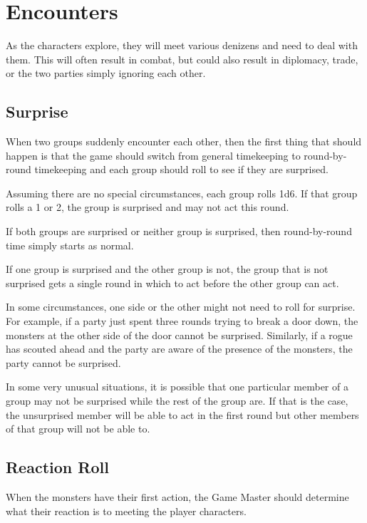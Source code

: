 \chapter[green]{Encounters}
\label{chap:Encounters}
\thispagestyle{plain}

\begin{multicols*}{2}
As the characters explore, they will meet various denizens and need to deal with them. This will often result in combat, but could also result in diplomacy, trade, or the two parties simply ignoring each other.

\section{Surprise}\label{sec:Surprise}
When two groups suddenly encounter each other, then the first thing that should happen is that the game should switch from general timekeeping to round-by-round timekeeping and each group should roll to see if they are surprised.

Assuming there are no special circumstances, each group rolls 1d6. If that group rolls a 1 or 2, the group is surprised and may not act this round.

If both groups are surprised or neither group is surprised, then round-by-round time simply starts as normal.

If one group is surprised and the other group is not, the group that is not surprised gets a single round in which to act before the other group can act.

In some circumstances, one side or the other might not need to roll for surprise. For example, if a party just spent three rounds trying to break a door down, the monsters at the other side of the door cannot be surprised. Similarly, if a rogue has scouted ahead and the party are aware of the presence of the monsters, the party cannot be surprised.

In some very unusual situations, it is possible that one particular member of a group may not be surprised while the rest of the group are. If that is the case, the unsurprised member will be able to act in the first round but other members of that group will not be able to.

\section{Reaction Roll}
When the monsters have their first action, the Game Master should determine what their reaction is to meeting the player characters.


\end{multicols*}
